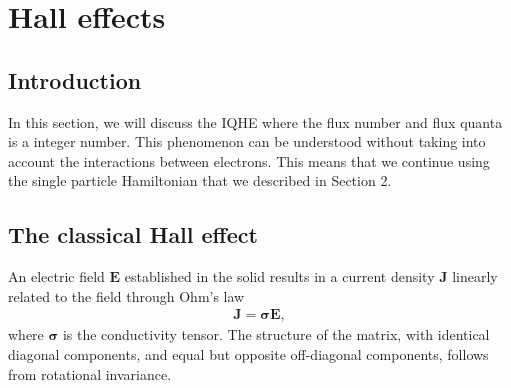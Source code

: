 \documentclass{report}
\begin{document}

\section{Hall effects}
\subsection{Introduction}
In this section, we will discuss the \ac{IQHE} where the flux number and flux quanta is a integer number. This phenomenon can be understood without taking into account the interactions between electrons. This means that we continue using the single particle Hamiltonian that we described in Section 2.

\subsection{The classical Hall effect}
An electric field $\mathbf{E}$ established in the solid results in a current density $\mathbf{J}$ linearly related to the field through Ohm's law
\begin{gather}
	\mathbf{J} = \boldsymbol{\sigma} \mathbf{E},
\end{gather}
where $\boldsymbol{\sigma}$ is the conductivity tensor. The structure of the matrix, with identical diagonal components, and equal but opposite off-diagonal components, follows from rotational invariance.
\end{document}
